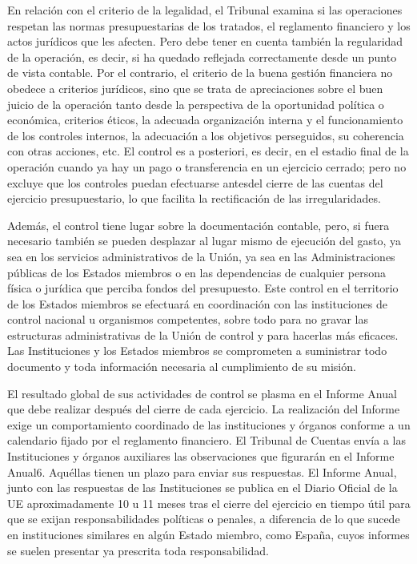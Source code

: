 \documentclass[10pt,a4paper]{article}
\begin{document}
En relación con el criterio de la legalidad, el Tribunal examina si las operaciones respetan las normas presupuestarias de los tratados, el reglamento financiero y los actos jurídicos que les afecten. Pero debe tener en cuenta también la regularidad de la operación, es decir, si ha quedado reflejada correctamente desde un punto de vista contable. Por el contrario, el criterio de la buena gestión financiera no obedece a criterios jurídicos, sino que se trata de apreciaciones sobre el buen juicio de la operación tanto desde la perspectiva de la oportunidad política o económica, criterios éticos, la adecuada organización interna y el funcionamiento de los controles internos, la adecuación a los objetivos perseguidos, su coherencia con otras acciones, etc. El control es a posteriori, es decir, en el estadio final de la operación cuando ya hay un pago o transferencia en un ejercicio cerrado; pero no excluye que los controles puedan efectuarse antesdel cierre de las cuentas del ejercicio presupuestario, lo que facilita la rectificación de las irregularidades.

Además, el control tiene lugar sobre la documentación contable, pero, si fuera necesario también se pueden desplazar al lugar mismo de ejecución del gasto, ya sea en los servicios administrativos de la Unión, ya sea en las Administraciones públicas de los Estados miembros o en las dependencias de cualquier persona física o jurídica que perciba fondos del presupuesto. Este control en el territorio de los Estados miembros se efectuará en coordinación con las instituciones de control nacional u organismos competentes, sobre todo para no gravar las estructuras administrativas de la Unión de control y para hacerlas más eficaces. Las Instituciones y los Estados miembros se comprometen a suministrar todo documento y toda información necesaria al cumplimiento de su misión.

El resultado global de sus actividades de control se plasma en el Informe Anual que debe realizar después del cierre de cada ejercicio. La realización del Informe exige un comportamiento coordinado de las instituciones y órganos conforme a un calendario fijado por el reglamento financiero. El Tribunal de Cuentas envía a las Instituciones y órganos auxiliares las observaciones que figurarán en el Informe Anual6. Aquéllas tienen un plazo para enviar sus respuestas. El Informe Anual, junto con las respuestas de las Instituciones se publica en el Diario Oficial de la UE aproximadamente 10 u 11 meses tras el cierre del ejercicio en tiempo útil para que se exijan responsabilidades políticas o penales, a diferencia de lo que sucede en instituciones similares en algún Estado miembro, como España, cuyos informes se suelen presentar ya prescrita toda responsabilidad.
\end{document}
